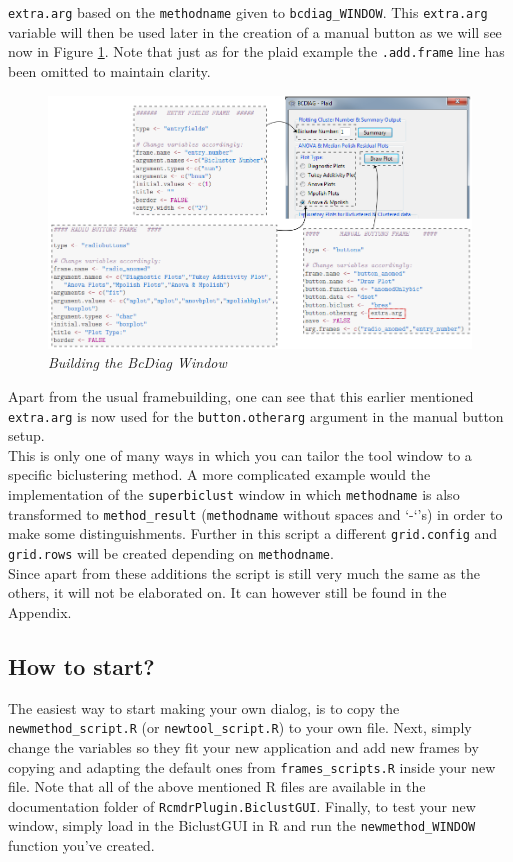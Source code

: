 \documentclass[a4paper]{article}\usepackage[]{graphicx}\usepackage[]{color}
\begin{document}
\verb|extra.arg| based on the \verb|methodname| given to \verb|bcdiag_WINDOW|.
This \verb|extra.arg| variable will then be used later in the creation of a
manual button as we will see now in Figure \ref{bcdiag_build}. Note that just as
for the plaid example the \verb|.add.frame| line has been omitted to maintain
clarity.
\begin{figure}[H]
\centering
\includegraphics[scale=0.45]{figures/bcdiag_build.png}
\caption{{\it Building the BcDiag Window}
\label{bcdiag_build}}
\end{figure}
\noindent Apart from the usual framebuilding, one can see that this earlier
mentioned \verb|extra.arg| is now used for the \verb|button.otherarg| argument in the
manual button setup. \\
This is only one of many ways in which you can tailor the tool window to a
specific biclustering method. A more complicated example would the implementation of the
\verb|superbiclust| window in which \verb|methodname| is also transformed to
\verb|method_result| (\verb|methodname| without spaces and `-`'s) in order to
make some distinguishments. Further in this script a different
\verb|grid.config| and \verb|grid.rows| will be created depending on
\verb|methodname|.\\
Since apart from these additions the script is still very much the same as the
others, it will not be elaborated on. It can however still be found in the
Appendix.
\subsection{How to start?}
\noindent The easiest way to start making your own dialog, is to copy the
\verb|newmethod_script.R| (or \verb|newtool_script.R|) to your own file. Next,
simply change the variables so they fit your new application and add new frames
by copying and adapting the default ones from \verb|frames_scripts.R| inside your
new file. Note that all of the above mentioned R files are available in the documentation
folder of \verb|RcmdrPlugin.BiclustGUI|.
Finally, to test your new window, simply load in the BiclustGUI in R and
run the \verb|newmethod_WINDOW| function you've created.
\end{document}
